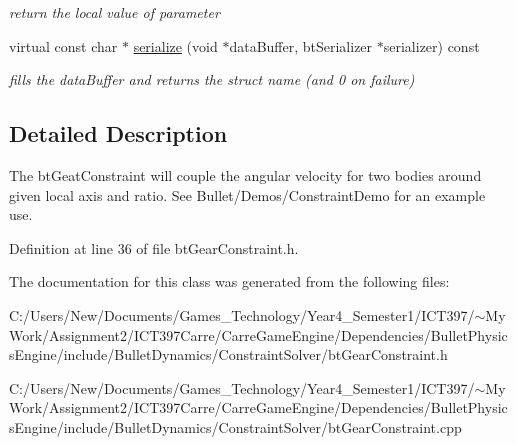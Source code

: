 \begin{CompactItemize}
\begin{CompactList}\small\item\em return the local value of parameter \item\end{CompactList}\item 
\hypertarget{classbt_gear_constraint_223dc7a58e6d97f6b9cd5bd73b1dd440}{
virtual const char $\ast$ \hyperlink{classbt_gear_constraint_223dc7a58e6d97f6b9cd5bd73b1dd440}{serialize} (void $\ast$dataBuffer, btSerializer $\ast$serializer) const }
\label{classbt_gear_constraint_223dc7a58e6d97f6b9cd5bd73b1dd440}

\begin{CompactList}\small\item\em fills the dataBuffer and returns the struct name (and 0 on failure) \item\end{CompactList}\end{CompactItemize}


\subsection{Detailed Description}
The btGeatConstraint will couple the angular velocity for two bodies around given local axis and ratio. See Bullet/Demos/ConstraintDemo for an example use. 

Definition at line 36 of file btGearConstraint.h.

The documentation for this class was generated from the following files:\begin{CompactItemize}
\item 
C:/Users/New/Documents/Games\_\-Technology/Year4\_\-Semester1/ICT397/$\sim$My Work/Assignment2/ICT397Carre/CarreGameEngine/Dependencies/BulletPhysicsEngine/include/BulletDynamics/ConstraintSolver/btGearConstraint.h\item 
C:/Users/New/Documents/Games\_\-Technology/Year4\_\-Semester1/ICT397/$\sim$My Work/Assignment2/ICT397Carre/CarreGameEngine/Dependencies/BulletPhysicsEngine/include/BulletDynamics/ConstraintSolver/btGearConstraint.cpp\end{CompactItemize}
